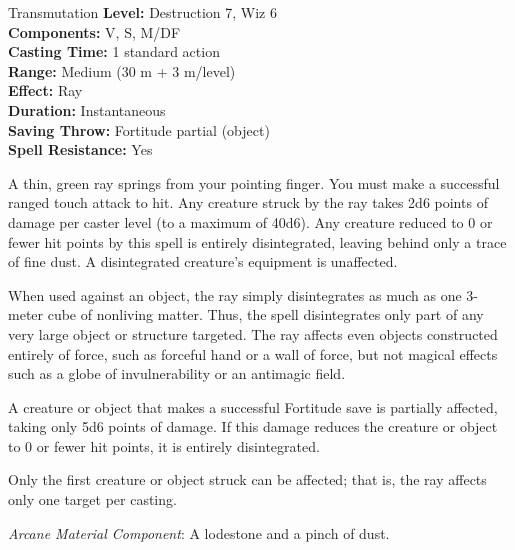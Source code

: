 {Transmutation}
{
	\textbf{Level:}
	Destruction 7, Wiz 6\\
	\textbf{Components:}
	V, S, M/DF\\
	\textbf{Casting Time:}
	1 standard action\\
	\textbf{Range:}
	Medium (30 m + 3 m/level)\\
	\textbf{Effect:}
	Ray\\
	\textbf{Duration:}
	Instantaneous\\
	\textbf{Saving Throw:}
	Fortitude partial (object)\\
	\textbf{Spell Resistance:}
	Yes\\
}
{
	A thin, green ray springs from your pointing finger. You must make a successful ranged touch attack to hit. Any creature struck by the ray takes 2d6 points of damage per caster level (to a maximum of 40d6). Any creature reduced to 0 or fewer hit points by this spell is entirely disintegrated, leaving behind only a trace of fine dust. A disintegrated creature's equipment is unaffected.

	When used against an object, the ray simply disintegrates as much as one 3-meter cube of nonliving matter. Thus, the spell disintegrates only part of any very large object or structure targeted. The ray affects even objects constructed entirely of force, such as forceful hand or a wall of force, but not magical effects such as a globe of invulnerability or an antimagic field.

	A creature or object that makes a successful Fortitude save is partially affected, taking only 5d6 points of damage. If this damage reduces the creature or object to 0 or fewer hit points, it is entirely disintegrated.

	Only the first creature or object struck can be affected; that is, the ray affects only one target per casting.

	\textit{Arcane Material Component}:
	A lodestone and a pinch of dust.

}
